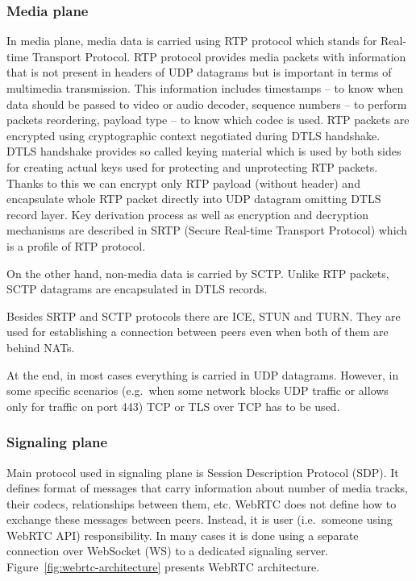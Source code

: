 \subsubsection{Media plane}
\label{subsubsec:media-plane}
In media plane, media data is carried using RTP protocol which stands for Real-time Transport Protocol.
RTP protocol provides media packets with information that is not present in headers of UDP datagrams but is important in terms of multimedia transmission.
This information includes timestamps -- to know when data should be passed to video or audio decoder, sequence numbers -- to perform packets reordering, payload type -- to know which codec is used.
RTP packets are encrypted using cryptographic context negotiated during DTLS handshake.
DTLS handshake provides so called keying material which is used by both sides for creating actual keys used for protecting and unprotecting RTP packets.
Thanks to this we can encrypt only RTP payload (without header) and encapsulate whole RTP packet directly into UDP datagram omitting DTLS record layer.
Key derivation process as well as encryption and decryption mechanisms are described in SRTP (Secure Real-time Transport Protocol) which is a profile of RTP protocol.

On the other hand, non-media data is carried by SCTP\@.
Unlike RTP packets, SCTP datagrams are encapsulated in DTLS records.

Besides SRTP and SCTP protocols there are ICE, STUN and TURN\@.
They are used for establishing a connection between peers even when both of them are behind NATs.

At the end, in most cases everything is carried in UDP datagrams.
However, in some specific scenarios (e.g.\ when some network blocks UDP traffic or allows only for traffic on port 443) TCP or TLS over TCP has to be used.

\subsubsection{Signaling plane}
Main protocol used in signaling plane is Session Description Protocol (SDP).
It defines format of messages that carry information about number of media tracks, their codecs, relationships between them, etc.
WebRTC does not define how to exchange these messages between peers.
Instead, it is user (i.e.\ someone using WebRTC API) responsibility.
In many cases it is done using a separate connection over WebSocket (WS) to a dedicated signaling server.
Figure~\ref{fig:webrtc-architecture} presents WebRTC architecture.

